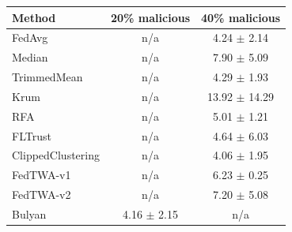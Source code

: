 \begin{tabular}{lcc}
\toprule
Method & 20\% malicious & 40\% malicious \\
\midrule
FedAvg & n/a & 4.24 $\pm$ 2.14 \\
Median & n/a & 7.90 $\pm$ 5.09 \\
TrimmedMean & n/a & 4.29 $\pm$ 1.93 \\
Krum & n/a & 13.92 $\pm$ 14.29 \\
RFA & n/a & 5.01 $\pm$ 1.21 \\
FLTrust & n/a & 4.64 $\pm$ 6.03 \\
ClippedClustering & n/a & 4.06 $\pm$ 1.95 \\
FedTWA-v1 & n/a & 6.23 $\pm$ 0.25 \\
FedTWA-v2 & n/a & 7.20 $\pm$ 5.08 \\
Bulyan & 4.16 $\pm$ 2.15 & n/a \\
\bottomrule
\end{tabular}